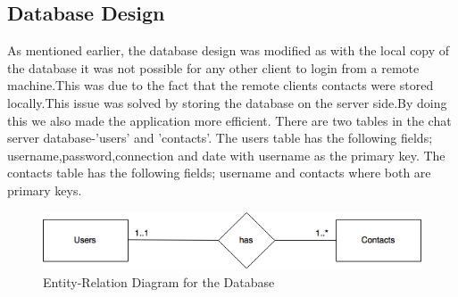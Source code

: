 \documentclass[finalReport.tex]{subfiles}
\begin{document}
\subsection{Database Design}

As mentioned earlier, the database design was modified as with the local copy of the database it was not possible for any other client to login from a remote machine.This was due to the fact that the remote clients contacts were stored locally.This issue was solved by storing the database on the server side.By doing this we also made the application more efficient. 
There are two tables in the chat server database-'users' and 'contacts'. The users table has the following fields;  username,password,connection and date with username as the primary key. The contacts table has the following fields; username and contacts where both are primary keys. 

\begin{figure}[h] 
\centering
\includegraphics[scale=0.75]{db.png}
\caption{Entity-Relation Diagram for the Database}\label{db}
\end{figure}
\end{document}
